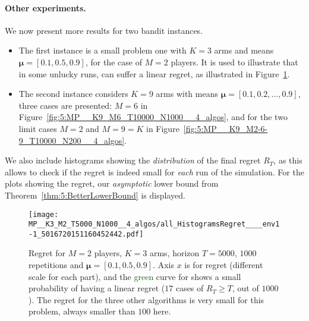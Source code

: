 \paragraph{Other experiments.}
%
We now present more results for two bandit instances.
\begin{itemize}
  \item
  The first instance is a small problem one with $K=3$ arms and means
  $\boldsymbol{\mu} = [0.1, 0.5, 0.9]$, for the case of $M=2$ players.
  It is used to illustrate that in some unlucky runs, \Selfish{} can suffer a linear regret, as illustrated in Figure~\ref{fig:5:selfish_fail1}.
  \item
  The second instance considers $K=9$ arms with means $\boldsymbol{\mu} = [0.1, 0.2, \dots, 0.9]$,
  three cases are presented: $M=6$ in Figure~\ref{fig:5:MP__K9_M6_T10000_N1000__4_algos},
  and for the two limit cases $M=2$ and $M=9=K$ in Figure~\ref{fig:5:MP__K9_M2-6-9_T10000_N200__4_algos}.
\end{itemize}
%
We also include histograms showing the \emph{distribution} of the final regret $R_T$,
as this allows to check if the regret is indeed small for \emph{each} run of the simulation.
%
For the plots showing the regret, our \emph{asymptotic} lower bound from Theorem~\ref{thm:5:BetterLowerBound} is displayed.


%
%
\begin{figure}[!t]
  \centering
      \texttt{[image: MP\_\_K3\_M2\_T5000\_N1000\_\_4\_algos/all\_HistogramsRegret\_\_\_\_env1-1\_5016720151160452442.pdf]}
  \caption[Failure case of \Selfish]{Regret for $M=2$ players, $K=3$ arms, horizon $T=5000$, $1000$ repetitions and $\boldsymbol{\mu} = [0.1, 0.5, 0.9]$. Axis $x$ is for regret (different scale for each part), and the \textcolor{darkgreen}{green} curve for \Selfish{} shows a small probability of having a linear regret ($17$ cases of $R_T \geq T$, out of $1000$). The regret for the three other algorithms is very small for this problem, always smaller than $100$ here.}
  \label{fig:5:selfish_fail1}
\end{figure}

